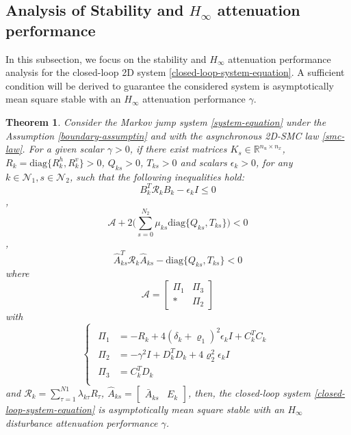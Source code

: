 \documentclass[conference]{IEEEtran}
\newtheorem{theorem}{Theorem}
\begin{document}
\subsection{Analysis of Stability and $H_{\infty}$ attenuation performance } \label{stability&H_infty}
 In this subsection, we focus on the stability and $H_{\infty}$ attenuation performance analysis for the closed-loop 2D system \eqref{closed-loop-system-equation}. A sufficient condition will be derived to guarantee the considered system is  asymptotically mean square stable with an $H_{\infty}$ attenuation performance $\gamma$.
\begin{theorem}\label{theorem1}
	Consider the  Markov jump system \eqref{system-equation} under the Assumption \eqref{boundary-assumptin} and with the asynchronous 2D-SMC law \eqref{smc-law}. For a given scalar $\gamma>0$, if there exist matrices $K_{s}\in\mathbb{R}^{n_u\times n_x}$,  $R_{k}=\mathrm{diag}\{R^{h}_{k},R^{v}_{k}\}>0$,  $Q_{ks}>0$, $T_{ks}>0$ and scalars $\epsilon_{k}>0$, for any $k\in\mathcal{N}_{1}, s\in\mathcal{N}_{2}$,  such that the following inequalities hold: 
	\begin{equation}\label{T1C1}
	B^{T}_{k}  	\mathcal{R}_{k} B_{k} -\epsilon_{k}I \leq 0
	\end{equation},
	\begin{equation}\label{T1C2}
	\mathcal{A} +2\Big(\sum_{s=0}^{N_{2}}\mu_{ks} \mathrm{diag}\{Q_{ks}, T_{ks}\}\Big) < 0
	\end{equation},
	\begin{equation}\label{T1C3}
	\hat{A}^{T}_{ks}\mathcal{R}_{k}\hat{A}_{ks} - \mathrm{diag}\{Q_{ks}, T_{ks}\} < 0
	\end{equation}
	where
	\begin{equation*}
	\mathcal{A}=\begin{bmatrix}
	\varPi_{1} & \varPi_{3}\\
	*&\varPi_{2}
	\end{bmatrix}
	\end{equation*} with
	\begin{equation*} \label{varPi}
	\left\{
	\begin{array}{lr}
	\begin{split}
	\varPi_{1}&=-R_{k}+4(\delta_{k}+\varrho_{1})^{2}\epsilon_{k}I+C^{T}_{k}C_{k}\\
	\varPi_{2}&=-\gamma^{2}I+D^{T}_{k}D_{k}+4\varrho_{2}^{2}\epsilon_{k}I\\
	\varPi_{3}&= C_{k}^{T}D_{k}\\
	\end{split}
	\end{array}
	\right.
	\end{equation*}
	and $\mathcal{R}_{k}=\sum_{\tau=1}^{N1}\lambda_{k\tau}R_{\tau}$, $\hat{A}_{ks}=\begin{bmatrix}
	\bar{A}_{ks}& E_{k}
	\end{bmatrix}$, 
	then, the closed-loop system \eqref{closed-loop-system-equation} is asymptotically mean square stable with an $H_{\infty}$ disturbance attenuation performance $\gamma$.
\end{theorem}
\end{document}
